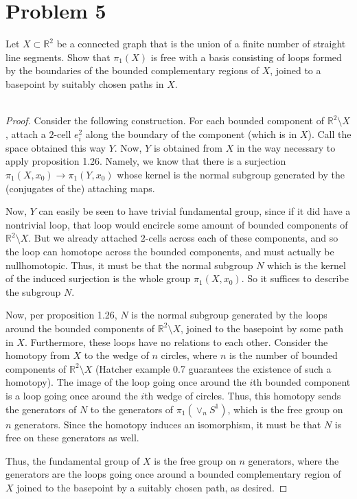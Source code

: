 \documentclass[fontsize=11pt]{scrartcl} %
\numberwithin{equation}{section} %
\numberwithin{figure}{section} %
\numberwithin{table}{section} %
\newcommand{\R}{\mathbb{R}}
\begin{document}
\section*{Problem 5}
Let $X\subset \R^2$ be a connected graph that is the union of a finite number of
straight line segments. Show that $\pi_1(X)$ is free with a basis consisting of
loops formed by the boundaries of the bounded complementary regions of $X$,
joined to a basepoint by suitably chosen paths in $X$.
\\
\\
\begin{proof}
    Consider the following construction. For each bounded component of
    $\R^2\setminus X$, attach a $2$-cell $e^2_i$ along the boundary of the
    component (which is in $X$). Call the space obtained this way $Y$. Now, $Y$ is
    obtained from $X$ in the way necessary to apply proposition 1.26. Namely, we
    know that there is a surjection $\pi_1(X,x_0)\to \pi_1(Y,x_0)$ whose kernel
    is the normal subgroup generated by the (conjugates of the) attaching maps.

    Now, $Y$ can easily be seen to have trivial fundamental group, since if it
    did have a nontrivial loop, that loop would encircle some amount of bounded
    components of $\R^2\setminus X$. But we already attached $2$-cells across
    each of these components, and so the loop can homotope across the bounded
    components, and must actually be nullhomotopic.
    Thus, it must be that the normal subgroup $N$ which is the kernel of
    the induced surjection is the whole group $\pi_1(X,x_0)$. So it suffices to
    describe the subgroup $N$.

    Now, per proposition 1.26, $N$ is the normal subgroup generated by the
    loops around the bounded components of $\R^2\setminus X$, joined to the
    basepoint by some path in $X$. Furthermore, these loops have no relations to
    each other. Consider the homotopy from $X$ to the wedge of $n$ circles,
    where $n$ is the number of bounded components of $\R^2\setminus X$ (Hatcher
    example 0.7 guarantees the existence of such a homotopy). The image of the
    loop going once around the $i$th bounded component is a loop going once
    around the $i$th wedge of circles. Thus, this homotopy sends the generators
    of $N$ to the generators of $\pi_1(\vee_nS^1)$, which is the free group on
    $n$ generators. Since the homotopy induces an isomorphism, it must be that
    $N$ is free on these generators as well.

    Thus, the fundamental group of $X$ is the free group on $n$ generators,
    where the generators are the loops going once around a bounded complementary
    region of $X$ joined to the basepoint by a suitably chosen path, as desired.
\end{proof}
\end{document}
